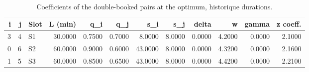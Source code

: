 \begin{table}[htbp]
\caption{Coefficients of the double-booked pairs at the optimum, historique durations.}
\label{tab:pairs-historique}
\begin{tabular}{rrlrrrrrrrrr}
\toprule
i & j & Slot & L (min) & q\_i & q\_j & s\_i & s\_j & delta & w & gamma & z coeff. \\
\midrule
3 & 4 & S1 & 30.0000 & 0.7500 & 0.7000 & 8.0000 & 8.0000 & 0.0000 & 4.2000 & 0.0000 & 2.1000 \\
0 & 6 & S2 & 60.0000 & 0.9000 & 0.6000 & 43.0000 & 8.0000 & 0.0000 & 4.3200 & 0.0000 & 2.1600 \\
1 & 5 & S3 & 60.0000 & 0.8500 & 0.6500 & 43.0000 & 8.0000 & 0.0000 & 4.4200 & 0.0000 & 2.2100 \\
\bottomrule
\end{tabular}
\end{table}
